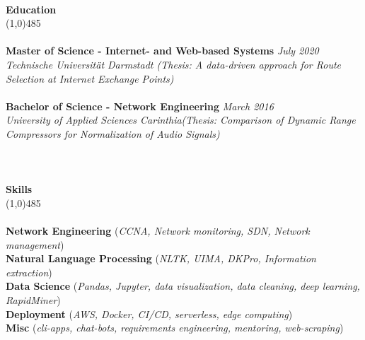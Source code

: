\documentclass[9pt]{extarticle}
\newcommand\tab[1][1cm]{\hspace*{#1}}
\newcommand\smallspace[1][0.23cm]{\hspace*{#1}}
\newcommand\negativespace[1][-0.12cm]{\hspace*{#1}}
\begin{document}
\noindent %
\\
\vspace*{-6pt}
{\negativespace \Large \bf Education}\\
\line(1,0){485}\\
\\
\noindent
{\bf Master of Science - Internet- and Web-based Systems} \hfill \textit{July 2020} \\ 
\textit{Technische Universität Darmstadt (Thesis: A data-driven approach for Route Selection at Internet Exchange Points)}\\\\
\noindent
{\bf Bachelor of Science - Network Engineering} \hfill \textit{March 2016} \\
\textit{University of Applied Sciences Carinthia(Thesis: Comparison of Dynamic Range Compressors for Normalization of Audio Signals)}\\
\\
\\\\
\vspace*{-6pt}
{\negativespace \Large \bf Skills}\\
\line(1,0){485}\\
\\
\noindent
{\bf Network Engineering }(\textit{CCNA, Network monitoring, SDN, Network management}) \\
{\bf Natural Language Processing }(\textit{NLTK, UIMA, DKPro, Information extraction}) \\
{\bf Data Science }(\textit{Pandas, Jupyter, data visualization, data cleaning, deep learning, RapidMiner}) \\
{\bf Deployment }(\textit{AWS, Docker, CI/CD, serverless, edge computing}) \\
{\bf Misc }(\textit{cli-apps, chat-bots, requirements engineering, mentoring, web-scraping}) \\\\
\end{document}
